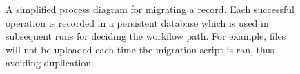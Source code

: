 \begin{figure}[ht!]
  \centering
  \caption{A simplified process diagram for migrating a record. Each successful operation is recorded in a persistent database which is used in subsequent runs for deciding the workflow path. For example, files will not be uploaded each time the migration script is ran, thus avoiding duplication.} 
  \label{fig:state}
\end{figure}

